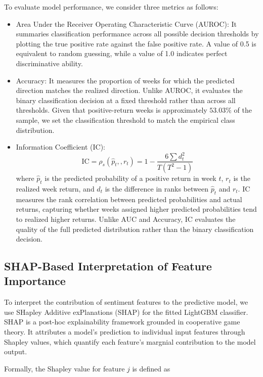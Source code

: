\documentclass[preprint,12pt,authoryear]{elsarticle}
\begin{document}
To evaluate model performance, we consider three metrics as follows: 
\begin{itemize}
    \item Area Under the Receiver Operating Characteristic Curve (AUROC): It summaries classification performance across all possible decision thresholds by plotting the true positive rate against the false positive rate. A value of 0.5 is equivalent to random guessing, while a value of 1.0 indicates perfect discriminative ability.
    \item Accuracy: It measures the proportion of weeks for which the predicted direction matches the realized direction. Unlike AUROC, it evaluates the binary classification decision at a fixed threshold rather than across all thresholds. Given that positive-return weeks is approximately $53.03\%$ of the sample, we set the classification threshold to match the empirical class distribution. 
    \item Information Coefficient (IC): \begin{equation}
\text{IC} = \rho_s\left(\hat{p}_t,, r_t\right) = 1 - \frac{6\sum d_t^2}{T(T^2-1)}
\label{eq:ic}
\end{equation}
where $\hat{p}_t$ is the predicted probability of a positive return in week $t$, $r_t$ is the realized week return, and $d_t$ is the difference in ranks between $\hat{p}_t$ and $r_t$. IC measures the rank correlation between predicted probabilities and actual returns, capturing whether weeks assigned higher predicted probabilities tend to realized higher returns. Unlike AUC and Accuracy, IC evaluates the quality of the full predicted distribution rather than the binary classification decision.
\end{itemize}


\subsection{SHAP-Based Interpretation of Feature Importance}
To interpret the contribution of sentiment features to the predictive model,
we use SHapley Additive exPlanations (SHAP) \citep{lundberg2017unified} for the fitted LightGBM classifier. SHAP is a post-hoc explainability framework grounded in cooperative game theory. It attributes a model’s prediction to individual input features through Shapley values, which quantify each feature's margnial contribution to the model output. 

Formally, the Shapley value for feature $j$ is defined as
\end{document}
